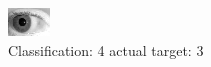 \begin{figure}[h!]
\begin{center}
\includegraphics[width=0.60\columnwidth]{figures/ID293_class_4_target_3.png}
\end{center}
\caption{ Classification: 4 actual target: 3}
\label{fig:ID293_class_4_target_3}
\end{figure}
